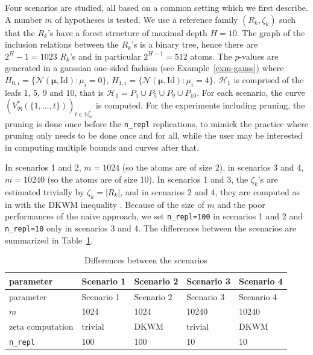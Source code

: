 \documentclass[
  11pt,
  a4paper,
]{article}
\theoremstyle{plain}
\theoremstyle{definition}
\theoremstyle{plain}
\theoremstyle{definition}
\theoremstyle{plain}
\theoremstyle{remark}
\begin{document}
Four scenarios are studied, all based on a common setting which we first
describe. A number \(m\) of hypotheses is tested. We use a reference
family \((R_k,\zeta_k)\) such that the \(R_k\)'s have a forest structure
of maximal depth \(H=10\). The graph of the inclusion relations between
the \(R_k\)'s is a binary tree, hence there are \(2^H-1=1023\) \(R_k\)'s
and in particular \(2^{H-1}=512\) atoms. The \(p\)-values are generated
in a gaussian one-sided fashion (see Example~\ref{exm-gauss}) where
\(H_{0,i}= \{ \mathcal N(\boldsymbol{\mu}, \mathrm{Id})  :\mu_i=0 \}\),
\(H_{1,i}=\{ \mathcal N(\boldsymbol{\mu}, \mathrm{Id}) :\mu_i=4 \}\).
\(\mathcal{H}_1\) is comprised of the leafs 1, 5, 9 and 10, that is
\(\mathcal{H}_1=P_1\cup P_5\cup P_9\cup P_{10}\). For each scenario, the
curve
\(\left(V^*_{\mathfrak{R}}(\{1,\dotsc,t \})\right)_{t\in\mathbb{N}_m^*}\)
is computed. For the experiments including pruning, the pruning is done
once before the \texttt{n\_repl} replications, to mimick the practice
where pruning only needs to be done once and for all, while the user may
be interested in computing multiple bounds and curves after that.

In scenarios 1 and 2, \(m=1024\) (so the atoms are of size 2), in
scenarios 3 and 4, \(m=10240\) (so the atoms are of size 10). In
scenarios 1 and 3, the \(\zeta_k\)'s are estimated trivially by
\(\zeta_k=|R_k|\), and in scenarios 2 and 4, they are computed as in
\citet{MR4178188} with the DKWM inequality \citep{MR0083864, MR1062069}.
Because of the size of \(m\) and the poor performances of the naive
approach, we set \texttt{n\_repl=100} in scenarios 1 and 2 and
\texttt{n\_repl=10} only in scenarios 3 and 4. The differences between
the scenarios are summarized in Table~\ref{tbl-scenarios}.

\begin{longtable}[]{@{}lllll@{}}
\caption{Differences between the
scenarios}\label{tbl-scenarios}\tabularnewline
\toprule\noalign{}
parameter & Scenario 1 & Scenario 2 & Scenario 3 & Scenario 4 \\
\midrule\noalign{}
\endfirsthead
\toprule\noalign{}
parameter & Scenario 1 & Scenario 2 & Scenario 3 & Scenario 4 \\
\midrule\noalign{}
\endhead
\bottomrule\noalign{}
\endlastfoot
\(m\) & 1024 & 1024 & 10240 & 10240 \\
zeta computation & trivial & DKWM & trivial & DKWM \\
\texttt{n\_repl} & 100 & 100 & 10 & 10 \\
\end{longtable}
\end{document}
